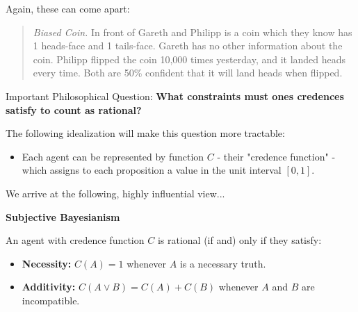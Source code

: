 \documentclass{tufte-handout}
\begin{document}
\noindent Again, these can come apart:

\begin{quote}
    \textit{Biased Coin.} In front of Gareth and Philipp is a coin which they know has 1 heads-face and 1 tails-face. Gareth has no other information about the coin. Philipp %
    flipped the coin 10,000 times yesterday, and it landed heads every time. Both are 50\% confident that it will land heads when flipped. 
\end{quote}

\noindent Important Philosophical Question: \textbf{What constraints must ones credences satisfy to count as rational? }

\vspace{2mm}

\noindent The following idealization  will make this question more tractable: 

\begin{itemize}
    \item Each agent can be represented by function $C$ - their "credence function" - which assigns to each proposition a value in the unit interval $[0,1]$.
\end{itemize}

\noindent We arrive at the following, highly influential view... 

\begin{exbox}
\textbf{Subjective Bayesianism}

\vspace{1mm}

An agent with credence function $C$ is rational (if and) only if they satisfy:

\begin{itemize}
    \item \textbf{Necessity:} $C(A)=1$ whenever $A$ is a necessary truth.

    \item\textbf{Additivity:} $C(A\vee B)=C(A)+C(B)$ whenever $A$ and $B$ are incompatible. 
\end{itemize}

\end{exbox}
\end{document}
